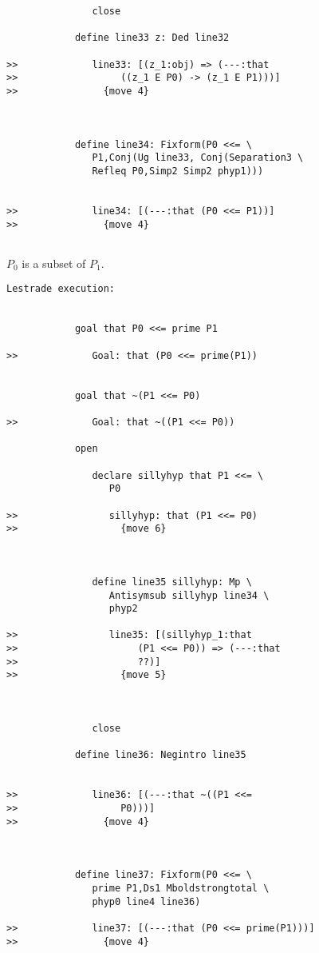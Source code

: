 \documentclass[12pt]{article}
\begin{document}
\begin{verbatim}
               close

            define line33 z: Ded line32

>>             line33: [(z_1:obj) => (---:that
>>                  ((z_1 E P0) -> (z_1 E P1)))]
>>               {move 4}



            define line34: Fixform(P0 <<= \
               P1,Conj(Ug line33, Conj(Separation3 \
               Refleq P0,Simp2 Simp2 phyp1)))


>>             line34: [(---:that (P0 <<= P1))]
>>               {move 4}


\end{verbatim}

$P_0$ is a subset of $P_1$.

\begin{verbatim}Lestrade execution:


            goal that P0 <<= prime P1

>>             Goal: that (P0 <<= prime(P1))


            goal that ~(P1 <<= P0)

>>             Goal: that ~((P1 <<= P0))

            open

               declare sillyhyp that P1 <<= \
                  P0

>>                sillyhyp: that (P1 <<= P0)
>>                  {move 6}



               define line35 sillyhyp: Mp \
                  Antisymsub sillyhyp line34 \
                  phyp2

>>                line35: [(sillyhyp_1:that
>>                     (P1 <<= P0)) => (---:that
>>                     ??)]
>>                  {move 5}



               close

            define line36: Negintro line35


>>             line36: [(---:that ~((P1 <<=
>>                  P0)))]
>>               {move 4}



            define line37: Fixform(P0 <<= \
               prime P1,Ds1 Mboldstrongtotal \
               phyp0 line4 line36)

>>             line37: [(---:that (P0 <<= prime(P1)))]
>>               {move 4}


\end{verbatim}
\end{document}
